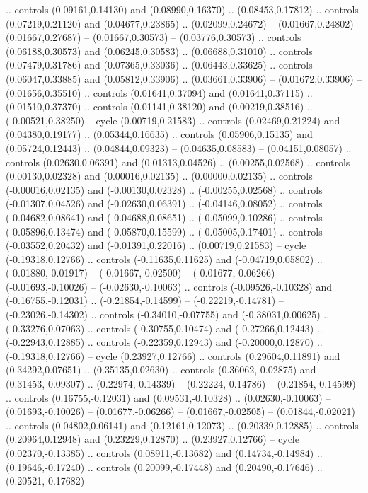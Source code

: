{{.. controls (0.09161,0.14130) and (0.08990,0.16370) .. (0.08453,0.17812)
.. controls (0.07219,0.21120) and (0.04677,0.23865) .. (0.02099,0.24672)
-- (0.01667,0.24802)
-- (0.01667,0.27687)
-- (0.01667,0.30573)
-- (0.03776,0.30573)
.. controls (0.06188,0.30573) and (0.06245,0.30583) .. (0.06688,0.31010)
.. controls (0.07479,0.31786) and (0.07365,0.33036) .. (0.06443,0.33625)
.. controls (0.06047,0.33885) and (0.05812,0.33906) .. (0.03661,0.33906)
-- (0.01672,0.33906)
-- (0.01656,0.35510)
.. controls (0.01641,0.37094) and (0.01641,0.37115) .. (0.01510,0.37370)
.. controls (0.01141,0.38120) and (0.00219,0.38516) .. (-0.00521,0.38250)
-- cycle
(0.00719,0.21583)
.. controls (0.02469,0.21224) and (0.04380,0.19177) .. (0.05344,0.16635)
.. controls (0.05906,0.15135) and (0.05724,0.12443) .. (0.04844,0.09323)
-- (0.04635,0.08583)
-- (0.04151,0.08057)
.. controls (0.02630,0.06391) and (0.01313,0.04526) .. (0.00255,0.02568)
.. controls (0.00130,0.02328) and (0.00016,0.02135) .. (0.00000,0.02135)
.. controls (-0.00016,0.02135) and (-0.00130,0.02328) .. (-0.00255,0.02568)
.. controls (-0.01307,0.04526) and (-0.02630,0.06391) .. (-0.04146,0.08052)
.. controls (-0.04682,0.08641) and (-0.04688,0.08651) .. (-0.05099,0.10286)
.. controls (-0.05896,0.13474) and (-0.05870,0.15599) .. (-0.05005,0.17401)
.. controls (-0.03552,0.20432) and (-0.01391,0.22016) .. (0.00719,0.21583)
-- cycle
(-0.19318,0.12766)
.. controls (-0.11635,0.11625) and (-0.04719,0.05802) .. (-0.01880,-0.01917)
-- (-0.01667,-0.02500)
-- (-0.01677,-0.06266)
-- (-0.01693,-0.10026)
-- (-0.02630,-0.10063)
.. controls (-0.09526,-0.10328) and (-0.16755,-0.12031) .. (-0.21854,-0.14599)
-- (-0.22219,-0.14781)
-- (-0.23026,-0.14302)
.. controls (-0.34010,-0.07755) and (-0.38031,0.00625) .. (-0.33276,0.07063)
.. controls (-0.30755,0.10474) and (-0.27266,0.12443) .. (-0.22943,0.12885)
.. controls (-0.22359,0.12943) and (-0.20000,0.12870) .. (-0.19318,0.12766)
-- cycle
(0.23927,0.12766)
.. controls (0.29604,0.11891) and (0.34292,0.07651) .. (0.35135,0.02630)
.. controls (0.36062,-0.02875) and (0.31453,-0.09307) .. (0.22974,-0.14339)
-- (0.22224,-0.14786)
-- (0.21854,-0.14599)
.. controls (0.16755,-0.12031) and (0.09531,-0.10328) .. (0.02630,-0.10063)
-- (0.01693,-0.10026)
-- (0.01677,-0.06266)
-- (0.01667,-0.02505)
-- (0.01844,-0.02021)
.. controls (0.04802,0.06141) and (0.12161,0.12073) .. (0.20339,0.12885)
.. controls (0.20964,0.12948) and (0.23229,0.12870) .. (0.23927,0.12766)
-- cycle
(0.02370,-0.13385)
.. controls (0.08911,-0.13682) and (0.14734,-0.14984) .. (0.19646,-0.17240)
.. controls (0.20099,-0.17448) and (0.20490,-0.17646) .. (0.20521,-0.17682)
}}
